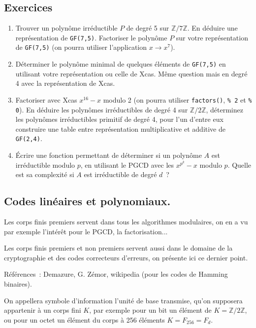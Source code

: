 \documentclass[a4paper,11pt]{article}
\newcommand{\Z}{{\mathbb{Z}}}
\begin{document}
\subsection{Exercices}
\begin{enumerate}
\item Trouver un polyn\^ome irr\'eductible $P$ de degr\'e 5 sur $\Z/7\Z$.
En d\'eduire une repr\'esentation de \verb|GF(7,5)|. Factoriser 
le polyn\^ome $P$ sur votre repr\'esentation de \verb|GF(7,5)| (on pourra utiliser
l'application $x \rightarrow x^7$).
\item D\'eterminer le polyn\^ome minimal de quelques \'el\'ements
de \verb|GF(7,5)| en utilisant votre repr\'esentation ou celle de Xcas.
M\^eme question mais en degr\'e 4 avec la repr\'esentation de Xcas.
\item Factoriser avec Xcas $x^{16}-x$ modulo 2 (on pourra utiliser
\verb|factors()|, \verb|% 2| et \verb|% 0|). 
En d\'eduire les polyn\^omes irr\'eductibles de degr\'e 4 sur
  $\Z/2\Z$, d\'eterminez les polyn\^omes irr\'eductibles
primitif de degr\'e 4, pour l'un d'entre eux construire une table entre repr\'esentation
multiplicative et additive de \verb|GF(2,4)|.
\item \'Ecrire une fonction permettant de d\'eterminer si un
  polyn\^ome $A$ est irr\'eductible modulo $p$, en utilisant le
PGCD avec les $x^{p^k}-x$ modulo $p$. Quelle est sa complexit\'e
si $A$ est irr\'eductible de degr\'e $d$~?
\end{enumerate}




\subsection{Codes lin\'eaires et polynomiaux.}
 
Les corps finis premiers servent dans tous les algorithmes modulaires,
on en a vu par exemple l'int\'er\^et pour le PGCD, la factorisation...

Les corps finis premiers et non premiers servent aussi dans le
domaine de la cryptographie et des codes correcteurs d'erreurs, 
on pr\'esente ici ce dernier point.

R\'ef\'erences~: Demazure, G. Z\'emor, wikipedia (pour les codes de
Hamming binaires).
 
On appellera symbole d'information l'unit\'e de base transmise, qu'on
supposera appartenir à un corps fini $K$, par
exemple pour un bit un élément de $K=\Z/2\Z$, ou pour un octet 
un \'el\'ement du corps à 256 éléments $K=F_{256}=F_d$.
\end{document}
